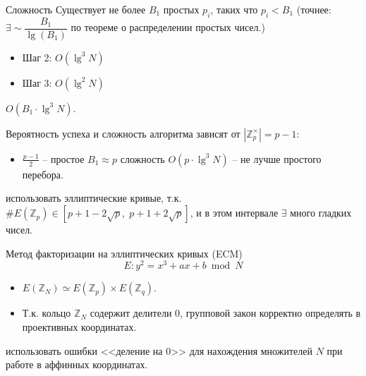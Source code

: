 \documentclass{beamer}
\begin{document}
\begin{frame}{Сложность}
Существует не более $B_1$ простых $p_i$, таких что $p_i < B_1$ (точнее: $\exists \sim \dfrac{B_1}{\lg ( B_1 )}$ по теореме о распределении простых чисел.)
\begin{itemize}
    \item Шаг 2: $O( \lg^3 N )$
    \item Шаг 3: $O( \lg^2 N )$
\end{itemize}
 $O( B_1 \cdot \lg^3 N)$.
\end{frame}

\begin{frame}
 Вероятность успеха и сложность алгоритма зависят от $|\mathbb{Z}_p^\times| = p - 1:$ \\
\begin{itemize}
    \item $\frac{p - 1}{2}$ -- простое \structure{$\Rightarrow$} $ {B_1} \approx p$ \structure{$\Rightarrow$} сложность $O( p \cdot \lg^3 N )$ -- не лучше простого перебора.
\end{itemize}

\vspace{1em}

 использовать эллиптические кривые, т.к.  $\# E( \mathbb{Z}_p ) \in [ p + 1 - 2\sqrt p ,\;p + 1 + 2\sqrt p ]$, и в этом интервале $\exists$ много гладких чисел. 
\end{frame}

\begin{frame}{Метод факторизации на эллиптических кривых (ECM)}
\[E: y^2 = x^3 + a x + b \bmod N\]
\begin{itemize}
    \item $E(\mathbb{Z}_N) \simeq E(\mathbb{Z}_p) \times E(\mathbb{Z}_q)$.
    \item Т.к. кольцо $\mathbb{Z}_N$ содержит делители $0$, групповой закон корректно определять в проективных координатах.
\end{itemize}
\vspace{1em}
 использовать ошибки <<деление на $0$>> для нахождения множителей $N$ при работе в аффинных координатах.
\end{frame}
\end{document}

